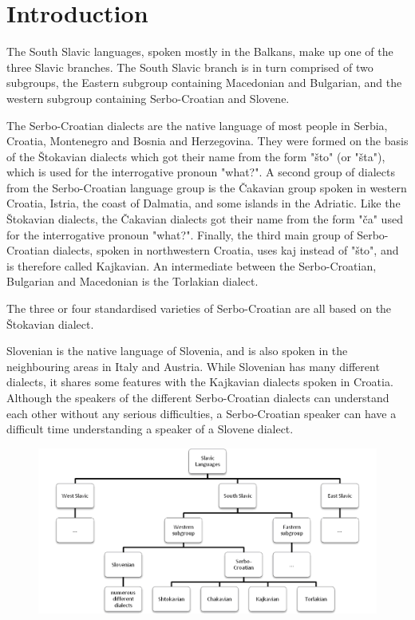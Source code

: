 \section{Introduction}

The South Slavic languages, spoken mostly in the Balkans, make up one of the three Slavic 
branches. The South Slavic branch is in turn comprised of two subgroups, the Eastern 
subgroup containing Macedonian and Bulgarian, and the western subgroup containing 
Serbo-Croatian and Slovene.

The Serbo-Croatian dialects are the native language of most people in Serbia, Croatia, 
Montenegro and Bosnia and Herzegovina. They were formed on the basis of the Štokavian dialects 
which got their name from the form "što" (or "šta"), which is used for the interrogative pronoun "what?". A second group of dialects from the Serbo-Croatian language group is the Čakavian group spoken in western Croatia, Istria, the coast of Dalmatia, and some islands in the Adriatic. Like the Štokavian dialects, the Čakavian dialects got their name from the form "ča" used for the interrogative pronoun "what?". Finally, the third main group of Serbo-Croatian dialects, spoken in northwestern Croatia, uses kaj instead of "što", and is therefore called Kajkavian.
An intermediate between the Serbo-Croatian, Bulgarian and Macedonian is the Torlakian dialect.

The three or four standardised varieties of Serbo-Croatian are all based on the Štokavian dialect.

Slovenian is the native language of Slovenia, and is also spoken in the neighbouring areas in Italy and Austria. While Slovenian has many different dialects, it shares some features with the Kajkavian dialects spoken in Croatia. Although the speakers of the different Serbo-Croatian dialects can understand each other without any serious difficulties, a Serbo-Croatian speaker can have a difficult time understanding a speaker of a Slovene dialect.

\begin{figure}

\includegraphics[scale=0.3]{images/chart.png}

\end{figure}


\begin{figure}


\end{figure}

